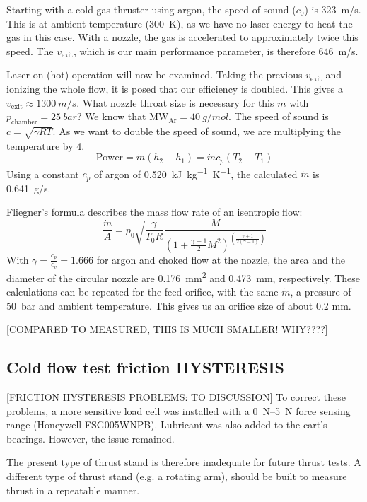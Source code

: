             Starting with a cold gas thruster using argon, the speed of sound ($c_0$) is \qty{323}{m/s}. This is at ambient temperature (\qty{300}{K}), as we have no laser energy to heat the gas in this case. With a nozzle, the gas is accelerated to approximately twice this speed. The $v_\mathrm{exit}$, which is our main performance parameter, is therefore \qty{646}{m/s}.
            
            Laser on (hot) operation will now be examined. Taking the previous $v_\mathrm{exit}$ and ionizing the whole flow, it is posed that our efficiency is doubled. This gives a $v_\mathrm{exit}\approx \qty{1300}{m/s}$. What nozzle throat size is necessary for this $\dot m$ with $p_\mathrm{chamber} = \qty{25}{bar}$? We know that $\mathrm{MW_{Ar}} = \qty{40}{g/mol}$. The speed of sound is $c = \sqrt{\gamma R T}$. As we want to double the speed of sound, we are multiplying the temperature by 4.
            \[\text{Power} = \dot m (h_2-h_1)
            = \dot m c_p (T_2-T_1)\]
            Using a constant $c_p$ of argon of \qty{0.520}{kJ.kg^{-1}.K^{-1}}, the calculated $\dot m$ is \qty{0.641}{g/s}.
            
            Fliegner's formula describes the mass flow rate of an isentropic flow:
            \[\frac{\dot m}{A} = p_0\sqrt{\frac{\gamma}{T_0 R}}\frac{M}{(1+\frac{\gamma-1}{2}M^2)^{(\frac{\gamma+1}{2(\gamma-1)})}}\]
            With $\gamma = \frac{c_p}{c_v} = 1.666$ for argon and choked flow at the nozzle, the area and the diameter of the circular nozzle are \qty{0.176}{mm^2} and \qty{0.473}{mm}, respectively. These calculations can be repeated for the feed orifice, with the same $\dot m$, a pressure of \qty{50}{bar} and ambient temperature. This gives us an orifice size of about 0.2 mm.

            [COMPARED TO MEASURED, THIS IS MUCH SMALLER! WHY????]
    
    \subsection{Cold flow test friction HYSTERESIS}

        [FRICTION HYSTERESIS PROBLEMS: TO DISCUSSION] To correct these problems, a more sensitive load cell was installed with a \qtyrange{0}{5}{N} force sensing range (Honeywell FSG005WNPB). Lubricant was also added to the cart's bearings. However, the issue remained.

        The present type of thrust stand is therefore inadequate for future thrust tests. A different type of thrust stand (e.g. a rotating arm), should be built to measure thrust in a repeatable manner.

